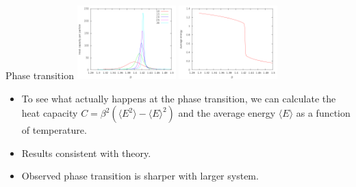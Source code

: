 \documentclass{beamer}
\begin{document}
\begin{frame}{Phase transition}
    \includegraphics[width=1.5in]{../results/wanglandau/capacity.png}
    \includegraphics[width=1.5in]{../results/wanglandau/e50.png}
    \begin{itemize}
        \item To see what actually happens at the phase transition, we can calculate the heat capacity $C = \beta^2\left(\langle E^2\rangle - \langle E\rangle^2\right)$ and the average energy $\langle E\rangle$ as a function of temperature.
        \item Results consistent with theory.
        \item Observed phase transition is sharper with larger system.
    \end{itemize}
\end{frame}
\end{document}
